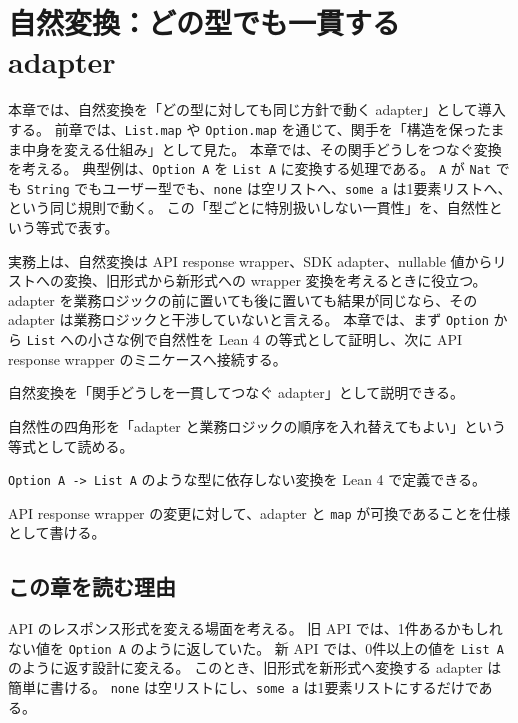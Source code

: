 \chapter{自然変換：どの型でも一貫する adapter}
\label{chap:natural-transformation}

\begin{chapterabstract}
本章では、自然変換を「どの型に対しても同じ方針で動く adapter」として導入する。
前章では、\texttt{List.map} や \texttt{Option.map} を通じて、関手を「構造を保ったまま中身を変える仕組み」として見た。
本章では、その関手どうしをつなぐ変換を考える。
典型例は、\texttt{Option A} を \texttt{List A} に変換する処理である。
\texttt{A} が \texttt{Nat} でも \texttt{String} でもユーザー型でも、\texttt{none} は空リストへ、\texttt{some a} は1要素リストへ、という同じ規則で動く。
この「型ごとに特別扱いしない一貫性」を、自然性という等式で表す。

実務上は、自然変換は API response wrapper、SDK adapter、nullable 値からリストへの変換、旧形式から新形式への wrapper 変換を考えるときに役立つ。
adapter を業務ロジックの前に置いても後に置いても結果が同じなら、その adapter は業務ロジックと干渉していないと言える。
本章では、まず \texttt{Option} から \texttt{List} への小さな例で自然性を Lean 4 の等式として証明し、次に API response wrapper のミニケースへ接続する。
\end{chapterabstract}

\begin{learninggoals}
\item 自然変換を「関手どうしを一貫してつなぐ adapter」として説明できる。
\item 自然性の四角形を「adapter と業務ロジックの順序を入れ替えてもよい」という等式として読める。
\item \texttt{Option A -> List A} のような型に依存しない変換を Lean 4 で定義できる。
\item API response wrapper の変更に対して、adapter と \texttt{map} が可換であることを仕様として書ける。
\end{learninggoals}

\section{この章を読む理由}

API のレスポンス形式を変える場面を考える。
旧 API では、1件あるかもしれない値を \texttt{Option A} のように返していた。
新 API では、0件以上の値を \texttt{List A} のように返す設計に変える。
このとき、旧形式を新形式へ変換する adapter は簡単に書ける。
\texttt{none} は空リストにし、\texttt{some a} は1要素リストにするだけである。

